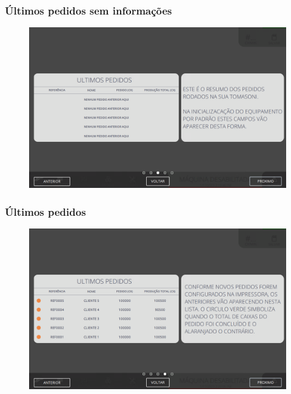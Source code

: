 \newpage
\thispagestyle{fancy}
\vspace*{40 pt}
\subsubsection{\small{Últimos pedidos sem informações}} \label{sec:telaPrincipalUltimosPedidosSemInformacoes}
\vspace*{\fill}
\begin{figure}[h]
    \centering
    \includegraphics[width=576 px,height=360 px]{src/imagesICV/01-main/4.png}
\end{figure}
\vspace*{\fill}

\newpage
\thispagestyle{fancy}
\vspace*{40 pt}
\subsubsection{\small{Últimos pedidos}} \label{sec:telaPrincipalUltimosPedidos}
\vspace*{\fill}
\begin{figure}[h]
    \centering
    \includegraphics[width=576 px,height=360 px]{src/imagesICV/01-main/5.png}
\end{figure}
\vspace*{\fill}

